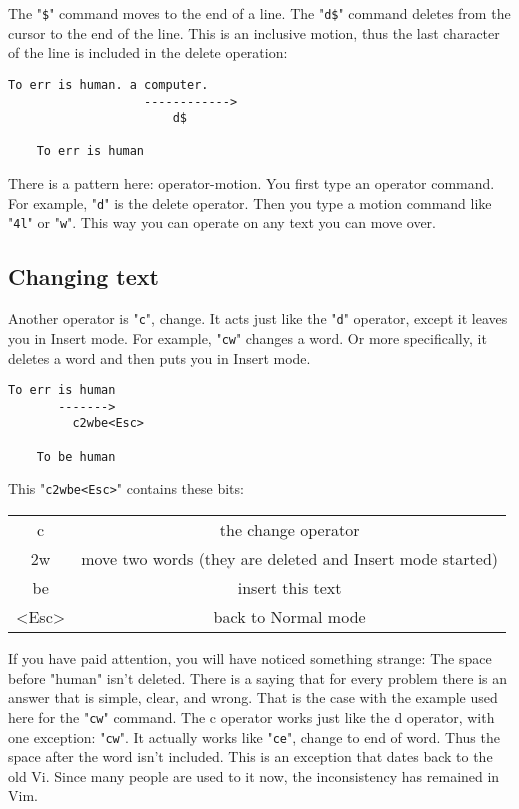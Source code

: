 The "\texttt{\$}" command moves to the end of a line.
The "\texttt{d\$}" command deletes from the cursor to the end of the line.
This is an inclusive motion, thus the last character of the line is included in the delete operation:

\begin{Verbatim}[samepage=true]
    To err is human. a computer. 
                   ------------>
                       d$

    To err is human 
\end{Verbatim}

There is a pattern here: operator-motion.
You first type an operator command.
For example, "\texttt{d}" is the delete operator.
Then you type a motion command like "\texttt{4l}" or "\texttt{w}".
This way you can operate on any text you can move over.

\subsection{Changing text}

Another operator is "\texttt{c}", change.
It acts just like the "\texttt{d}" operator, except it leaves you in Insert mode.
For example, "\texttt{cw}" changes a word.
Or more specifically, it deletes a word and then puts you in Insert mode.

\begin{Verbatim}[samepage=true]
    To err is human 
       ------->
         c2wbe<Esc>

    To be human 
\end{Verbatim}

This "\verb!c2wbe<Esc>!" contains these bits:
\begin{center}
\begin{tabular}{c c}
				c & the change operator\\
				2w & move two words (they are deleted and Insert mode started)\\
				be & insert this text\\
				<Esc> & back to Normal mode\\
\end{tabular}
\end{center}

If you have paid attention, you will have noticed something strange: The space before "human" isn't deleted.
There is a saying that for every problem there is an answer that is simple, clear, and wrong.
That is the case with the example used here for the "\texttt{cw}" command.
The c operator works just like the d operator, with one exception: "\texttt{cw}".
It actually works like "\texttt{ce}", change to end of word.
Thus the space after the word isn't included.
This is an exception that dates back to the old Vi.
Since many people are used to it now, the inconsistency has remained in Vim.

